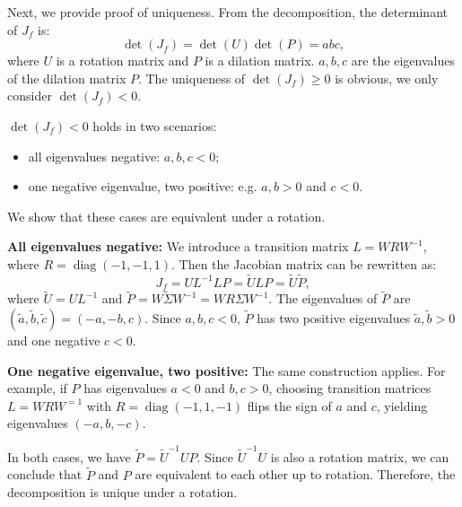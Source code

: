 \documentclass{article}
\begin{document}
Next, we provide proof of uniqueness. From the decomposition, the determinant of $J_f$ is:
\begin{equation}
    \operatorname{det}\left(J_f \right) = \operatorname{det}(U)\operatorname{det}(P) = abc,
\end{equation}
where $U$ is a rotation matrix and $P$ is a dilation matrix. $a,b,c$ are the eigenvalues of the dilation matrix $P$. The uniqueness of $\operatorname{det}\left(J_f \right) \geq 0$ is obvious, we only consider $\operatorname{det}\left(J_f \right) < 0$. 

$\operatorname{det}\left(J_f \right) < 0$ holds in two scenarios: 
\begin{itemize}
    \item all eigenvalues negative: $a,b,c<0$;
    \item one negative eigenvalue, two positive: e.g. $a,b >0$ and $c<0$.
\end{itemize}

We show that these cases are equivalent under a rotation.

\textbf{All eigenvalues negative:} We introduce a transition matrix $L = WRW^{-1}$, where $R = \operatorname{diag}(-1, -1, 1)$. Then the Jacobian matrix can be rewritten as:
\begin{equation}
        J_f = UL^{-1}LP = \widetilde{U}LP =\widetilde{U}\widetilde{P},
\end{equation}
where $\widetilde{U} = UL^{-1}$ and $\widetilde{P} = W\widetilde{\Sigma }W^{-1} = WR\Sigma  W^{-1}$. The eigenvalues of $\widetilde{P}$ are $\left(\widetilde{a} ,\widetilde{b},\widetilde{c}\right) = \left(-a,-b,c \right)$. Since $a,b,c<0$, $\widetilde{P}$ has two positive eigenvalues $\widetilde{a},\widetilde{b} >0$ and one negative $c<0$. 

\textbf{One negative eigenvalue, two positive:} The same construction applies. For example, if $P$ has eigenvalues $a<0$ and $b,c >0$, choosing transition matrices $L = WRW^{=1}$ with $R = \operatorname{diag}(-1,1,-1)$ flips the sign of $a$ and $c$, yielding eigenvalues $(-a,b,-c)$.

In both cases, we have $\widetilde{P} = \widetilde{U}^{-1}UP$. Since $\widetilde{U}^{-1}U$ is also a rotation matrix, we can conclude that $\widetilde{P}$ and $P$ are equivalent to each other up to rotation.  Therefore, the decomposition is unique under a rotation.

\end{document}

